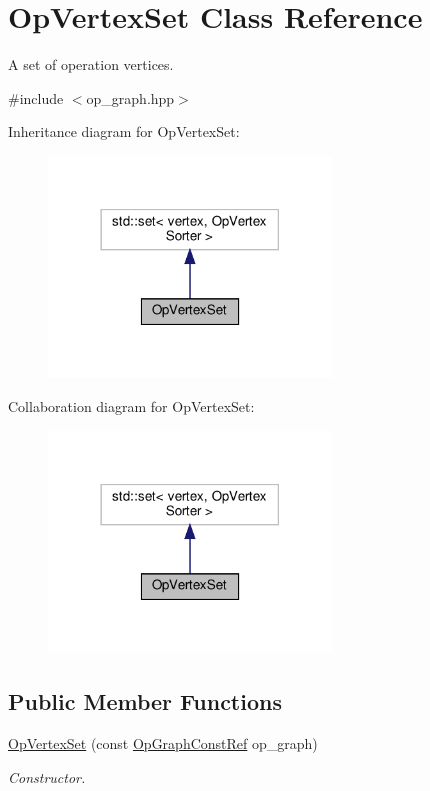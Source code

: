\hypertarget{classOpVertexSet}{}\section{Op\+Vertex\+Set Class Reference}
\label{classOpVertexSet}


A set of operation vertices.  




{\ttfamily \#include $<$op\+\_\+graph.\+hpp$>$}



Inheritance diagram for Op\+Vertex\+Set\+:
\nopagebreak
\begin{figure}[H]
\begin{center}
\leavevmode
\includegraphics[width=213pt]{d2/d14/classOpVertexSet__inherit__graph}
\end{center}
\end{figure}


Collaboration diagram for Op\+Vertex\+Set\+:
\nopagebreak
\begin{figure}[H]
\begin{center}
\leavevmode
\includegraphics[width=213pt]{dd/d48/classOpVertexSet__coll__graph}
\end{center}
\end{figure}
\subsection*{Public Member Functions}
\begin{DoxyCompactItemize}
\item 
\hyperlink{classOpVertexSet_a71cec1e0a30704080af2dc377c276e3a}{Op\+Vertex\+Set} (const \hyperlink{op__graph_8hpp_a9a0b240622c47584bee6951a6f5de746}{Op\+Graph\+Const\+Ref} op\+\_\+graph)
\begin{DoxyCompactList}\small\item\em Constructor. \end{DoxyCompactList}\end{DoxyCompactItemize}


